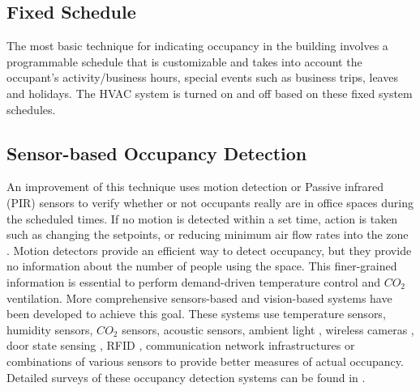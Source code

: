 \subsection{Fixed Schedule}

The most basic technique for indicating occupancy in the building involves a programmable schedule that is customizable and takes into account the occupant's activity/business hours, special events such as business trips, leaves and holidays. The HVAC system is turned on and off based on these fixed system schedules. 

\subsection{Sensor-based Occupancy Detection}

An improvement of this technique uses motion detection or Passive infrared (PIR) sensors \citep{agarwal2010occupancy} to verify whether or not occupants really are in office spaces during the scheduled times. If no motion is detected within a set time, action is taken such as changing the setpoints, or reducing minimum air flow rates into the zone \citep{zhang2013energy}. %
Motion detectors provide an efficient way to detect occupancy, but they provide no information about the number of people using the space. This finer-grained information is essential to perform demand-driven temperature control and $CO_2$ ventilation. More comprehensive sensors-based and vision-based systems have been developed to achieve this goal. These systems use temperature sensors, humidity sensors, $CO_{2}$ sensors, acoustic sensors, ambient light \citep{chang2013statistical}, wireless cameras \citep{erickson2009energy}, door state sensing \citep{agarwal2010occupancy,hutchins2007modeling}, RFID \citep{li2012measuring}, communication network infrastructures \citep{melfi2011measuring,zeiler2012wireless} or combinations of various sensors \citep{yun2012building,mamidi2012adaptive,lam2009occupancy,dong2009sensor,meyn2009sensor,barakat2016agent,pedersen2017method} to provide better measures of actual occupancy. Detailed surveys of these occupancy detection systems can be found in \citep{labeodan2015occupancy,liu2012review}.


